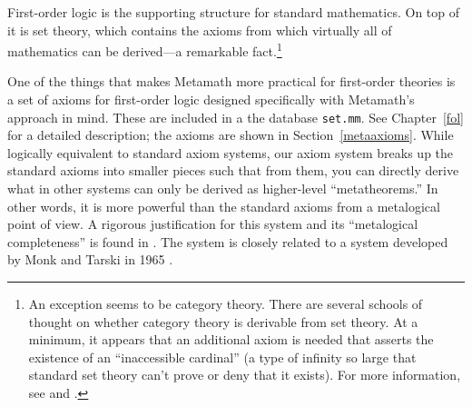 First-order logic is the supporting structure
for standard mathematics.  On top of it is set theory, which contains
the axioms from which virtually all of mathematics can be derived---a
remarkable fact.\label{categoryth}\footnote{An exception seems
to be category theory.  There are several schools of thought on whether
category theory is derivable from set theory.  At a minimum, it appears
that an additional axiom is needed that asserts the existence of an
``inaccessible cardinal'' (a type of infinity so large that standard set
theory can't prove or deny that it exists).
%
%
For more information, see
\cite[pp.~328--331]{Herrlich} and
\cite{Blass}.}

One of the things that makes Metamath more practical for
first-order theories is a set of axioms for first-order logic designed
specifically with Metamath's approach in mind.  These are included in a
the database \texttt{set.mm}.
See Chapter~\ref{fol} for a detailed
description; the axioms are shown in Section~\ref{metaaxioms}.  While
logically equivalent to standard axiom systems, our axiom system breaks
up the standard axioms into smaller pieces such that from them, you can
directly derive what in other systems can only be derived as higher-level
``metatheorems.''  In other words, it is more powerful than
the standard axioms from a metalogical point of view.  A rigorous
justification for this system and its ``metalogical
completeness'' is found in
\cite{Megill}.  The system is closely related to a
system developed by Monk and Tarski in 1965 \cite{Monks}.

